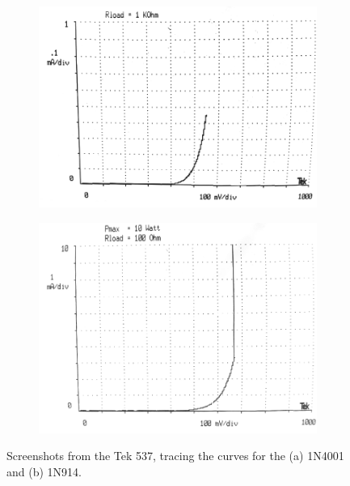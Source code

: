 \documentclass{report}
\begin{document}
\begin{figure}[H]
	\begin{subfigure}{0.5\textwidth}
		\centering
		\includegraphics[width=\linewidth]{exp1tek1}
		\caption{}
		\label{fig:exp1tek1}
	\end{subfigure}
	\begin{subfigure}{0.5\textwidth}
		\centering
		\includegraphics[width=\linewidth]{exp1tek2}
		\caption{}
		\label{fig:exp1tek2}
	\end{subfigure}
	\caption{Screenshots from the Tek 537, tracing the curves for the (a) 1N4001 and (b) 1N914. }
	\label{fig:exp1teks}
\end{figure}
\end{document}
